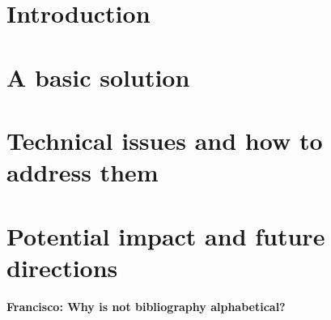\documentclass[conference]{IEEEtran}
\newcommand{\francisco}[1]{{\color{orange!40!olive}\textbf{Francisco: #1}}}
\begin{document}
\section{Introduction}
\label{sec:intro}



\section{A basic solution}
\label{sec:basic}



\section{Technical issues and how to address them}
\label{sec:tech}



\section{Potential impact and future directions}
\label{sec:future}


\francisco{Why is not bibliography alphabetical?}


\end{document}
